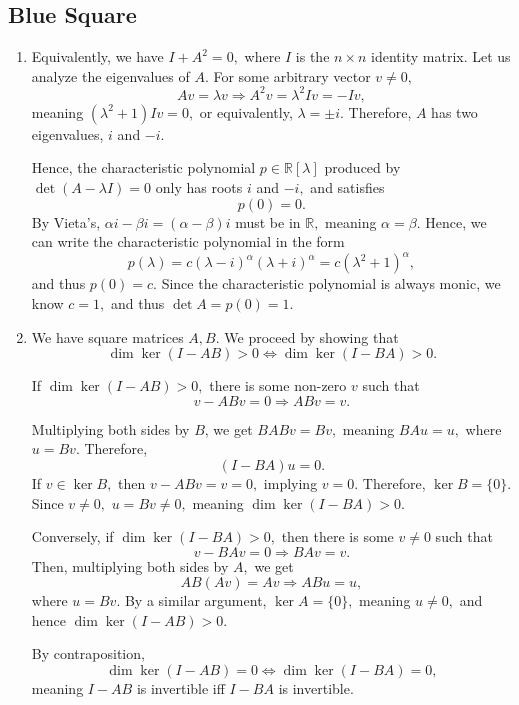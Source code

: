 \documentclass[12pt]{article}
\begin{document}
\subsection{Blue Square}
\begin{enumerate}
  \item[6] Equivalently, we have $I + A^2 = 0,$ where $I$ is the $n
    \times n$ identity matrix. Let us analyze the eigenvalues of $A.$
    For some arbitrary vector $v \neq 0,$ $$
    Av =  \lambda v \Rightarrow A^2v = \lambda ^2 Iv =  -Iv,
    $$
    meaning $(\lambda^2 + 1)I v = 0,$ or equivalently, $\lambda = \pm
    i.$ Therefore, $A$ has two eigenvalues, $i$ and $-i.$

    Hence, the characteristic polynomial $p \in \mathbb R[\lambda]$
    produced by $\det (A - \lambda I) = 0$ only has roots $i$ and
    $-i,$ and satisfies $$p(0) = 0.$$ By Vieta's, $\alpha i - \beta i
    = (\alpha - \beta)i$  must be in $\mathbb R,$ meaning $\alpha =
    \beta.$ Hence, we can write the characteristic polynomial in the form
    $$
    p(\lambda) = c(\lambda - i)^{\alpha}(\lambda + i)^{\alpha}=
    c(\lambda^2 + 1)^{\alpha},
    $$
    and thus $p(0) = c.$ Since the characteristic polynomial is
    always monic, we know $c = 1,$ and thus $\det A = p(0) = 1.$

  \item[8] We have square matrices $A, B.$ We proceed by showing that
    $$
    \dim \ker (I - AB) > 0 \Leftrightarrow \dim \ker (I - BA) > 0.
    $$

    If $\dim \ker (I - AB) > 0,$ there is some non-zero $v$ such that
    $$
    v - ABv = 0 \Rightarrow ABv = v.
    $$

    Multiplying both sides by $B$, we get $BABv = Bv,$ meaning $BAu =
    u,$ where $u = Bv.$ Therefore,
    $$
    (I - BA) u = 0.
    $$
    If $v \in \ker B,$ then $v - ABv = v = 0,$ implying $v = 0.$
    Therefore, $\ker B = \{0\}.$ Since $v \neq 0,$ $u = Bv \neq 0,$
    meaning $\dim \ker (I - BA) > 0.$

    Conversely, if $\dim \ker (I - BA) > 0,$ then there is some $v
    \neq 0$ such that
    $$
    v - BAv = 0 \Rightarrow BAv = v.
    $$
    Then, multiplying both sides by $A,$ we get $$
    AB(Av) =Av \Rightarrow AB u = u,
    $$
    where $u = Bv.$ By a similar argument, $\ker A = \{0\},$ meaning
    $u \neq 0,$ and hence $\dim \ker (I - AB) > 0.$

    By contraposition,
    $$
    \dim \ker (I - AB) = 0 \Leftrightarrow \dim \ker (I - BA) = 0,
    $$
    meaning $I - AB$ is invertible iff $I - BA$ is invertible.


\end{enumerate}
\end{document}
